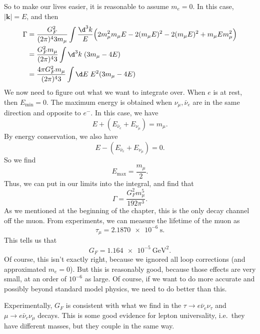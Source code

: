 \documentclass[a4paper]{article}
\begin{document}
So to make our lives easier, it is reasonable to assume $m_e = 0$. In this case, $|\mathbf{k}| = E$, and then
\begin{align*}
  \Gamma &= \frac{G_F^2}{(2\pi)^4 3m_\mu} \int \frac{\d^3 k}{E} \Big(2 m_\mu^2 m_\mu E - 2 (m_\mu E)^2 - 2 (m_\mu E)^2 + m_\mu E m_\mu^2\Big)\\
  &= \frac{G_F^2 m_\mu}{ (2\pi)^4 3} \int \d^3 k\; (3 m_\mu - 4 E)\\
  &= \frac{4\pi G_F^2 m_\mu}{(2\pi)^4 3} \int \d E\; E^2(3 m_\mu - 4E)
\end{align*}
We now need to figure out what we want to integrate over. When $e$ is at rest, then $E_{\mathrm{min}} = 0$. The maximum energy is obtained when $\nu_\mu, \bar{\nu}_e$ are in the same direction and opposite to $e^-$. In this case, we have
\[
  E + (E_{\bar{\nu}_e} + E_{\nu_\mu}) = m_\mu.
\]
By energy conservation, we also have
\[
  E - (E_{\bar{\nu}_e} + E_{\nu_\mu}) = 0.
\]
So we find
\[
  E_{\mathrm{max}} = \frac{m_\mu}{2}.
\]
Thus, we can put in our limits into the integral, and find that %
\[
  \Gamma = \frac{G_F^2 m_\mu^5}{192 \pi^3}.
\]
As we mentioned at the beginning of the chapter, this is the only decay channel off the muon. From experiments, we can measure the lifetime of the muon as
\[
  \tau_{\mu} = \SI{2.1870e-6}{\second}.
\]
This tells us that
\[
  G_F = \SI{1.164e-5}{\giga\electronvolt\squared}.
\]
Of course, this isn't exactly right, because we ignored all loop corrections (and approximated $m_e = 0$). But this is reasonably good, because those effects are very small, at an order of $10^{-6}$ as large. Of course, if we want to do more accurate and possibly beyond standard model physics, we need to do better than this.

Experimentally, $G_F$ is consistent with what we find in the $\tau \to e \bar{\nu}_e \nu_\tau$ and $\mu \to e \bar{\nu}_e \nu_\mu$ decays. This is some good evidence for lepton universality, i.e.\ they have different masses, but they couple in the same way.
\end{document}
